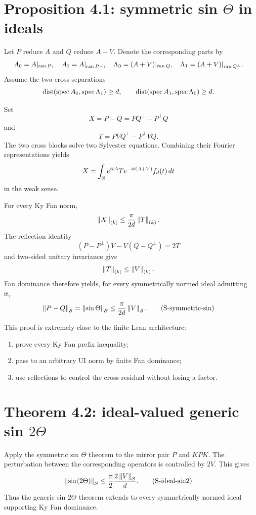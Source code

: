 \section{Proposition 4.1: symmetric sin $\Theta$ in ideals}

Let $P$ reduce $A$ and $Q$ reduce $A+V$. Denote the corresponding parts by
\[
 A_0=A|_{\operatorname{ran} P},
 \quad
 A_1=A|_{\operatorname{ran} P^\perp},
 \quad
 \Lambda_0=(A+V)|_{\operatorname{ran} Q},
 \quad
 \Lambda_1=(A+V)|_{\operatorname{ran} Q^\perp}.
\]
Assume the two cross separations
\[
 \operatorname{dist}(\operatorname{spec} A_0,\operatorname{spec}\Lambda_1)\ge d,
 \qquad
 \operatorname{dist}(\operatorname{spec} A_1,\operatorname{spec}\Lambda_0)\ge d.
\]

Set
\[
 X=P-Q=PQ^\perp-P^\perp Q
\]
and
\[
 T=PVQ^\perp-P^\perp VQ.
\]
The two cross blocks solve two Sylvester equations. Combining their Fourier representations yields
\[
 X
 =
 \int_{\mathbb{R}}e^{itA}Te^{-it(A+V)}f_d(t)\,dt
\]
in the weak sense.

For every Ky Fan norm,
\[
 \left\lVert X\right\rVert_{(k)}
 \le
 \frac{\pi}{2d}\left\lVert T\right\rVert_{(k)}.
\]
The reflection identity
\[
 (P-P^\perp)V-V(Q-Q^\perp)=2T
\]
and two-sided unitary invariance give
\[
 \left\lVert T\right\rVert_{(k)}\le\left\lVert V\right\rVert_{(k)}.
\]
Fan dominance therefore yields, for every symmetrically normed ideal admitting it,
\begin{equation}
 \left\lVert P-Q\right\rVert_{\mathcal S}
 =\left\lVert \sin\Theta\right\rVert_{\mathcal S}
 \le
 \frac{\pi}{2d}\left\lVert V\right\rVert_{\mathcal S}.
 \tag{S-symmetric-sin}
\end{equation}

This proof is extremely close to the finite Lean architecture:
\begin{enumerate}[leftmargin=2em]
\item prove every Ky Fan prefix inequality;
\item pass to an arbitrary UI norm by finite Fan dominance;
\item use reflections to control the cross residual without losing a factor.
\end{enumerate}

\section{Theorem 4.2: ideal-valued generic sin $2\Theta$}

Apply the symmetric sin $\Theta$ theorem to the mirror pair $P$ and $KPK$. The perturbation between the corresponding operators is controlled by $2V$. This gives
\begin{equation}
 \left\lVert \sin(2\Theta)\right\rVert_{\mathcal S}
 \le
 \frac{\pi}{2}\frac{2\left\lVert V\right\rVert_{\mathcal S}}{d}.
 \tag{S-ideal-sin2}
\end{equation}
Thus the generic sin $2\Theta$ theorem extends to every symmetrically normed ideal supporting Ky Fan dominance.

